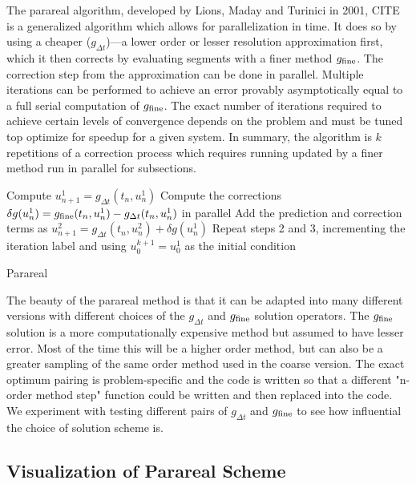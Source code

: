\documentclass[letterpaper,12pt]{article}
\begin{document}
The parareal algorithm, developed by Lions, Maday and Turinici in 2001, CITE is
a generalized algorithm which allows for parallelization in time. It does so
by using a cheaper ($g_{\Delta t}$)---a lower order or lesser resolution
approximation first, which it then corrects by evaluating segments with a finer
method $g_{\textnormal{fine}}$. The correction step from the approximation can
be done in parallel. Multiple iterations can be performed to achieve an error
provably asymptotically equal to a full serial computation of
$g_{\textnormal{fine}}$. The exact number of iterations required to achieve
certain levels of convergence depends on the problem and must be tuned top
optimize for speedup for a given system. In summary, the algorithm is $k$
repetitions of a correction process which requires running updated by a finer
method run in parallel for subsections.

\begin{algorithm}[t]
    Compute $u^1_{n+1} = g_{\Delta t}(t_n, u^1_n)$\;
    Compute the corrections $\delta g(u^1_n) = g_{\textnormal{fine}}(t_n,
    u^1_n) - g_{\Delta t}(t_n, u^1_n)$ in parallel\;
    Add the prediction and correction terms as $u^2_{n+1} = g_{\Delta t}(t_n,
    u^2_n) + \delta g(u^1_n)$\;
    Repeat steps 2 and 3, incrementing the iteration label and using $u^{k+1}_0
    = u^1_0$ as the initial condition\;
 \caption{Parareal}
 \label{alg:parareal}
\end{algorithm}

The beauty of the parareal method is that it can be adapted into many different versions with different choices of the $g_{\Delta t}$ and $g_{\textnormal{fine}}$ solution operators. The $g_{\textnormal{fine}}$ solution is a more computationally expensive method but assumed to have lesser error.  Most of the time this will be a higher order method, but can also be a greater sampling of the same order method used in the coarse version.  The exact optimum pairing is problem-specific and the code is written so that a different "n-order method step" function could be written and then replaced into the code. We experiment with testing different pairs of $g_{\Delta t}$ and $g_{\textnormal{fine}}$ to see how influential the choice of solution scheme is.

\subsection{Visualization of Parareal Scheme}
\end{document}
